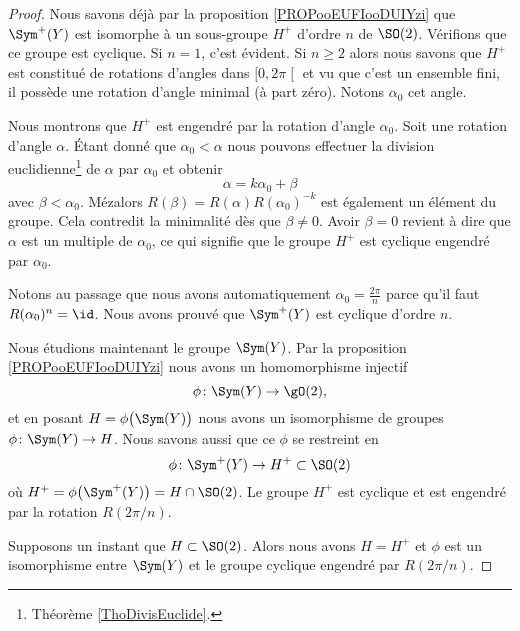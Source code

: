 \begin{proof}
    Nous savons déjà par la proposition \ref{PROPooEUFIooDUIYzi} que \( \Sym^+(Y)\) est isomorphe à un sous-groupe \( H^+\) d'ordre \( n\) de \( \SO(2)\). Vérifions que ce groupe est cyclique. Si \( n=1\), c'est évident. Si \( n\geq 2\) alors nous savons que \( H^+\) est constitué de rotations d'angles dans \( \mathopen[ 0 , 2\pi \mathclose[\) et vu que c'est un ensemble fini, il possède une rotation d'angle minimal (à part zéro). Notons \( \alpha_0\) cet angle.

        Nous montrons que \( H^+\) est engendré par la rotation d'angle \( \alpha_0\). Soit une rotation d'angle \( \alpha\). Étant donné que \( \alpha_0<\alpha\) nous pouvons effectuer la division euclidienne\footnote{Théorème \ref{ThoDivisEuclide}.} de \( \alpha\) par \( \alpha_0\) et obtenir
        \begin{equation}
            \alpha=k\alpha_0+\beta
        \end{equation}
        avec \( \beta<\alpha_0\). Mézalors \( R(\beta)=R(\alpha)R(\alpha_0)^{-k}\) est également un élément du groupe. Cela contredit la minimalité dès que \( \beta\neq 0\). Avoir \( \beta=0\) revient à dire que \( \alpha\) est un multiple de \( \alpha_0\), ce qui signifie que le groupe \( H^+\) est cyclique engendré par \( \alpha_0\). 

        Notons au passage que nous avons automatiquement \( \alpha_0=\frac{ 2\pi }{ n }\) parce qu'il faut \( R(\alpha_0)^n=\id\). Nous avons prouvé que \( \Sym^+(Y) \) est cyclique d'ordre \( n\).

        Nous étudions maintenant le groupe \( \Sym(Y)\). Par la proposition \ref{PROPooEUFIooDUIYzi} nous avons un homomorphisme injectif
        \begin{equation}
            \phi\colon \Sym(Y)\to \gO(2),
        \end{equation}
        et en posant \( H=\phi\big( \Sym(Y) \big)\) nous avons un isomorphisme de groupes \( \phi\colon \Sym(Y)\to H\). Nous savons aussi que ce \( \phi\) se restreint en
        \begin{equation}
            \phi\colon   \Sym^+(Y) \to H^+\subset\SO(2)
        \end{equation}
        où \( H^+=\phi\big( \Sym^+(Y) \big)=H\cap\SO(2)\). Le groupe \( H^+\) est cyclique et est engendré par la rotation \( R(2\pi/n)\).

        Supposons un instant que \( H\subset \SO(2)\). Alors nous avons \( H=H^+\) et \( \phi\) est un isomorphisme entre \( \Sym(Y)\) et le groupe cyclique engendré par \( R(2\pi/n)\).


\end{proof}
